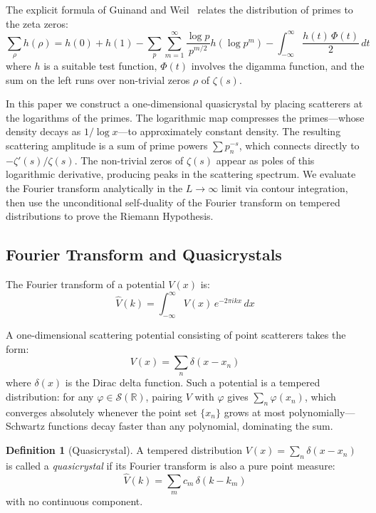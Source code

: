 \documentclass[11pt, oneside]{article}
\theoremstyle{definition}
\newtheorem{definition}[theorem]{Definition}
\begin{document}
The explicit formula of Guinand and Weil~\cite{Weil} relates the
distribution of primes to the zeta zeros:
\begin{equation}
\sum_{\rho} h(\rho) = h(0) + h(1)
  - \sum_{p} \sum_{m=1}^{\infty}
    \frac{\log p}{p^{m/2}} h(\log p^m)
  - \int_{-\infty}^{\infty} \frac{h(t)\,\Phi(t)}{2}\,dt
\end{equation}
where $h$ is a suitable test function, $\Phi(t)$ involves the
digamma function, and the sum on the left runs over non-trivial
zeros $\rho$ of $\zeta(s)$.

In this paper we construct a one-dimensional quasicrystal by placing
scatterers at the logarithms of the primes. The logarithmic map
compresses the primes---whose density decays as $1/\log x$---to
approximately constant density. The resulting scattering amplitude
is a sum of prime powers $\sum p_n^{-s}$, which connects directly
to $-\zeta'(s)/\zeta(s)$. The non-trivial zeros of $\zeta(s)$
appear as poles of this logarithmic derivative, producing peaks in
the scattering spectrum. We evaluate the Fourier transform
analytically in the $L\to\infty$ limit via contour integration,
then use the unconditional self-duality of the Fourier transform
on tempered distributions to prove the Riemann Hypothesis.

\subsection{Fourier Transform and Quasicrystals}

The Fourier transform of a potential $V(x)$ is:
\begin{equation}
\hat{V}(k) = \int_{-\infty}^{\infty} V(x)\,e^{-2\pi ikx}\,dx
\end{equation}

A one-dimensional scattering potential consisting of point
scatterers takes the form:
\begin{equation}
V(x) = \sum_{n}\delta(x - x_n)
\end{equation}
where $\delta(x)$ is the Dirac delta function.
Such a potential is a tempered distribution: for any
$\varphi \in \mathcal{S}(\mathbb{R})$, pairing $V$ with $\varphi$
gives $\sum_n \varphi(x_n)$, which converges absolutely whenever
the point set $\{x_n\}$ grows at most polynomially---Schwartz
functions decay faster than any polynomial, dominating the sum.

\begin{definition}[Quasicrystal]
A tempered distribution $V(x) = \sum_n \delta(x - x_n)$ is called
a \emph{quasicrystal} if its Fourier transform is also a pure point
measure:
\begin{equation}
\hat{V}(k) = \sum_{m} c_m\,\delta(k - k_m)
\end{equation}
with no continuous component.
\end{definition}
\end{document}
